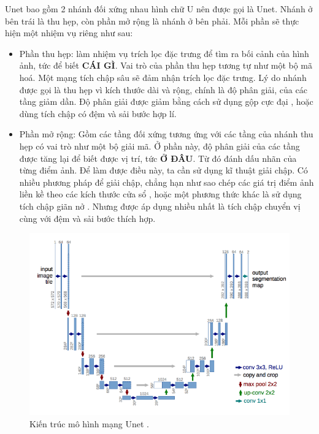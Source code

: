 \documentclass[a4paper, 12pt]{report}
\begin{document}
Unet bao gồm 2 nhánh đối xứng nhau hình chữ U nên được gọi là Unet.
Nhánh ở bên trái là thu hẹp, còn phần mở rộng là nhánh ở bên phải.
Mỗi phần sẽ thực hiện một nhiệm vụ riêng như sau:

\begin{itemize}
    \item Phần thu hẹp: làm nhiệm vụ trích lọc đặc trưng để tìm ra bối cảnh của hình ảnh, tức để biết \textbf{CÁI GÌ}.
    Vai trò của phần thu hẹp tương tự như một bộ mã hoá.
    Một mạng tích chập sâu sẽ đảm nhận trích lọc đặc trưng.
    Lý do nhánh được gọi là thu hẹp vì kích thước dài và rộng, chính là độ phân giải, của các tầng giảm dần.
    Độ phân giải được giảm bằng cách sử dụng gộp cực đại \cite{wikimaxpooling2021}, hoặc dùng tích chập có đệm và sải bước hợp lí.
    
    \item Phần mở rộng: Gồm các tầng đối xứng tương ứng với các tầng của nhánh thu hẹp có vai trò như một bộ giải mã.
    Ở phần này, độ phân giải của các tầng được tăng lại để biết được vị trí, tức \textbf{Ở ĐÂU}.
    Từ đó đánh dấu nhãn của từng điểm ảnh.
    Để làm được điều này, ta cần sử dụng kĩ thuật giải chập.
    Có nhiều phương pháp để giải chập, chẳng hạn như sao chép các giá trị điểm ảnh liền kề theo các kích thước cửa sổ \cite{khanhunet2020}, hoặc một phương thức khác là sử dụng tích chập giãn nở \cite{yu2016multiscale}.
    Nhưng được áp dụng nhiều nhất là tích chập chuyển vị \cite{divyanshutransconv2020} cùng với đệm và sải bước thích hợp.
\end{itemize}

\begin{figure}[!h]
\captionsetup{width=0.8\textwidth}
\centering
\includegraphics[width=15cm]{images/2_8.png}
\caption{Kiến trúc mô hình mạng Unet \cite{ronneberger2015unet}.}
\end{figure}
\end{document}
